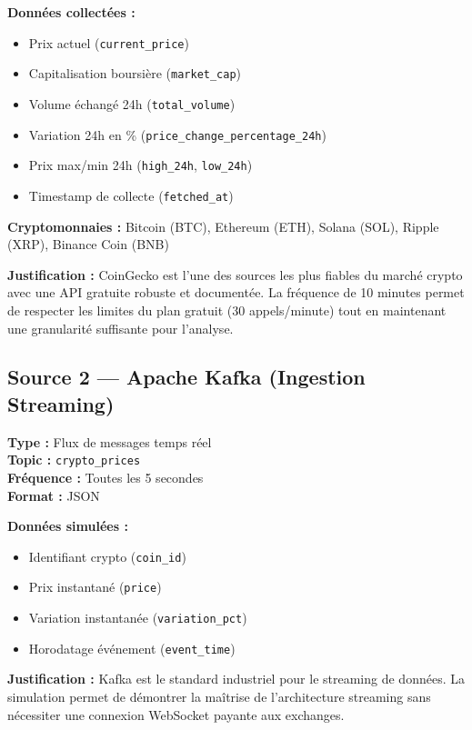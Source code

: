 \documentclass[12pt,a4paper]{article}
\begin{document}
\textbf{Données collectées :}
\begin{itemize}[noitemsep]
    \item Prix actuel (\texttt{current\_price})
    \item Capitalisation boursière (\texttt{market\_cap})
    \item Volume échangé 24h (\texttt{total\_volume})
    \item Variation 24h en \% (\texttt{price\_change\_percentage\_24h})
    \item Prix max/min 24h (\texttt{high\_24h}, \texttt{low\_24h})
    \item Timestamp de collecte (\texttt{fetched\_at})
\end{itemize}

\textbf{Cryptomonnaies :} Bitcoin (BTC), Ethereum (ETH), Solana (SOL), Ripple (XRP), Binance Coin (BNB)

\textbf{Justification :} CoinGecko est l'une des sources les plus fiables du marché crypto avec une API gratuite robuste et documentée. La fréquence de 10 minutes permet de respecter les limites du plan gratuit (30 appels/minute) tout en maintenant une granularité suffisante pour l'analyse.

\subsection{Source 2 --- Apache Kafka (Ingestion Streaming)}
\textbf{Type :} Flux de messages temps réel\\
\textbf{Topic :} \texttt{crypto\_prices}\\
\textbf{Fréquence :} Toutes les 5 secondes\\
\textbf{Format :} JSON

\textbf{Données simulées :}
\begin{itemize}[noitemsep]
    \item Identifiant crypto (\texttt{coin\_id})
    \item Prix instantané (\texttt{price})
    \item Variation instantanée (\texttt{variation\_pct})
    \item Horodatage événement (\texttt{event\_time})
\end{itemize}

\textbf{Justification :} Kafka est le standard industriel pour le streaming de données. La simulation permet de démontrer la maîtrise de l'architecture streaming sans nécessiter une connexion WebSocket payante aux exchanges.
\end{document}
